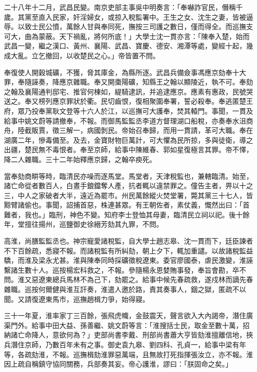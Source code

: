 \begin{pinyinscope}
二十八年十二月，武昌民變。南京吏部主事吳中明奏言：「奉嚇詐官民，僭稱千歲。其黨至直入民家，奸淫婦女，或掠入稅監署中。王生之女、沈生之妻，皆被逼辱。以致士民公憤，萬餘人甘與奉同死，撫按三司護之數日，僅而得全。而巡撫支可大，曲為蒙蔽。天下禍亂，將何所底！」大學士沈一貫亦言：「陳奉入楚，始而武昌一變，繼之漢口、黃州、襄陽、武昌、寶慶、德安、湘潭等處，變經十起，幾成大亂。立乞撤回，以收楚民之心。」帝皆置不問。

奉復使人開穀城礦，不獲，脅其庫金，為縣所逐。武昌兵備僉事馮應京劾奉十大罪，奉隨誣奏，降應京雜職。奉又開棗陽礦，知縣王之翰以顯陵近，執不可。奉劾之翰及襄陽通判邸宅、推官何棟如，緹騎逮訊，并追逮應京。應素有惠政，民號哭送之。奉又榜列應京罪狀於衢。民切齒恨，復相聚圍奉署，誓必殺奉。奉逃匿楚王府，眾乃投奉黨耿文登等十六人於江，以巡撫可大護奉，焚其轅門。事聞，一貫及給事中姚文蔚等請撤奉，不報。而御馬監監丞李道方督理湖口船稅，亦奏奉水沮商舟，陸截販賈，徵三解一，病國剝民。帝始召奉歸，而用一貫請，革可大職。奉在湖廣二年，慘毒備至。及去，金寶財物巨萬計，可大懼為民所掠，多與徒衛，導之出疆，楚民無不毒恨者。奉至京師，給事中陳維春、郭如星復極言其罪。帝不懌，降二人雜職。三十二年始釋應京歸，之翰卒瘐死。

當奉劾商畊等時，臨清民亦噪而逐馬堂。馬堂者，天津稅監也，兼轄臨清。始至，諸亡命從者數百人，白晝手鋃鐺奪人產，抗者輒以違禁罪之。僮告主者，畀以十之三，中人之家破者大半，遠近為罷市。州民萬餘縱火焚堂署，斃其黨三十七人，皆黥臂諸偷也。事聞，詔捕首惡，株連甚眾。有王朝佐者，素仗義，慨然出曰：「首難者，我也。」臨刑，神色不變。知府李士登恤其母妻，臨清民立祠以祀。後十餘年，堂擅往揚州，巡鹽御史徐縉芳劾其九罪，不問。

高淮，尚膳監監丞也。神宗寵愛諸稅監，自大學士趙志皋、沈一貫而下，廷臣諫者不下百餘疏，悉寢不報。而諸稅監有所糾劾，朝上夕下，輒加重譴。以故諸稅監益驕，而淮及梁永尤甚。淮與陳奉同時採礦徵稅遼東。委官廖國泰，虐民激變，淮誣繫諸生數十人。巡按楊宏科救之，不報。參隨楊永恩婪賄事發，奉旨會勘，卒不問。淮又惡遼東總兵馬林不為己下，劾罷之。給事中候先春疏救，遂戍林而謫先春雜職。巡按何爾健與淮互訐奏，淮遣人邀於路，責其奏事人，錮之獄，匿疏不以聞。又請復遼東馬市，巡撫趙楫力爭，始得寢。

三十一年夏，淮率家丁三百餘，張飛虎幟，金鼓震天，聲言欲入大內謁帝，潛住廣渠門外。給事中田大益、孫善繼、姚文蔚等言：「淮搜括士民，取金至數十萬，招納諸亡命降人，意欲何為？」吏部尚書李戴、刑部尚書蕭大亨皆劾淮擅離信地，挾兵潛住京師，乃數百年未有之事。御史袁九皋、劉四科、孔貞一，給事中梁有年等，各疏劾淮，不報。巡撫楫劾淮罪惡萬端，且無故打死指揮張汝立，亦不報。淮因上疏自稱鎮守協同關務，兵部奏其妄。帝心護淮，謬曰：「朕固命之矣。」


\end{pinyinscope}
